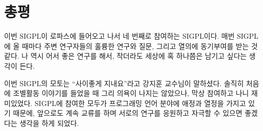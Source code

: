 \documentclass{article}
\begin{document}
\section{총평}
이번 SIGPL이 로파스에 들어오고 나서 네 번째로 참여하는 SIGPL이다.
매번 SIGPL에 올 때마다 주변 연구자들의 훌륭한 연구와 질문, 그리고 열의에 동기부여를 받는 것 같다.
나 역시 어서 좋은 연구를 해서, 작더라도 세상에 혹 하나쯤은 남기고 싶다는 생각이 든다.

이번 SIGPL의 모토는 ``사이좋게 지내요''라고 강지훈 교수님이 말하셨다.
솔직히 처음에 조별활동 이야기를 들었을 때 그리 의욕이 나지는 않았으나, 막상 참여하고 나니 재미있었다.
SIGPL에 참여한 모두가 프로그래밍 언어 분야에 애정과 열정을 가지고 있기 때문에, 앞으로도 계속 교류를 하며 서로의 연구를 응원하고 자극할 수 있으면 좋겠다는 생각을 하게 되었다.
\end{document}
